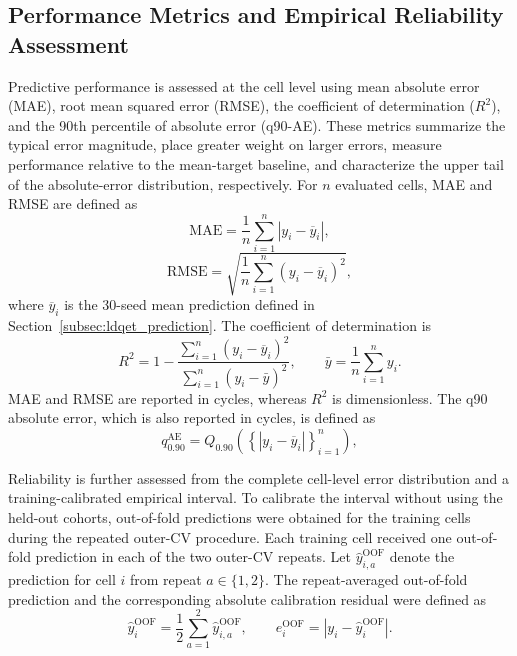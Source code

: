 \documentclass[pdflatex,sn-mathphys-num]{sn-jnl}
\begin{document}
\subsection{Performance Metrics and Empirical Reliability Assessment}
\label{subsec:reliability_protocol}

Predictive performance is assessed at the cell level using mean absolute error (MAE), root mean squared error (RMSE), the coefficient of determination ($R^2$), and the 90th percentile of absolute error
(q90-AE). These metrics summarize the typical error magnitude, place greater weight on larger errors, measure performance relative to the mean-target baseline, and characterize the upper tail of the absolute-error distribution, respectively. For $n$ evaluated cells, MAE and RMSE are defined as
\begin{equation}
\mathrm{MAE}=
\frac{1}{n}\sum_{i=1}^{n}\left|y_i-\overline{y}_i\right|,
\label{eq:mae}
\end{equation}
\begin{equation}
\mathrm{RMSE}=
\sqrt{\frac{1}{n}\sum_{i=1}^{n}\left(y_i-\overline{y}_i\right)^2},
\label{eq:rmse}
\end{equation}
where $\overline{y}_i$ is the 30-seed mean prediction defined in Section~\ref{subsec:ldqet_prediction}. The coefficient of determination is
\begin{equation}
R^2=
1-\frac{\sum_{i=1}^{n}\left(y_i-\overline{y}_i\right)^2}
{\sum_{i=1}^{n}\left(y_i-\bar{y}\right)^2},
\qquad
\bar{y}=\frac{1}{n}\sum_{i=1}^{n}y_i.
\label{eq:r2}
\end{equation}
MAE and RMSE are reported in cycles, whereas $R^2$ is dimensionless. The q90 absolute error, which is also reported in cycles, is defined as
\begin{equation}
q_{0.90}^{\mathrm{AE}}=
Q_{0.90}\!\left(
\left\{|y_i-\overline{y}_i|\right\}_{i=1}^{n}
\right),
\end{equation}

Reliability is further assessed from the complete cell-level error distribution and a training-calibrated empirical interval. To calibrate the interval without using the held-out cohorts, out-of-fold predictions were obtained for the training cells during the repeated outer-CV procedure. Each training cell received one out-of-fold prediction in each of the two outer-CV repeats. Let $\widehat{y}_{i,a}^{\mathrm{OOF}}$ denote the prediction for cell $i$ from repeat $a\in\{1,2\}$. The repeat-averaged out-of-fold prediction and the corresponding absolute calibration residual were defined as
\begin{equation}
\widehat{y}_i^{\mathrm{OOF}}
=
\frac{1}{2}
\sum_{a=1}^{2}
\widehat{y}_{i,a}^{\mathrm{OOF}},
\qquad
e_i^{\mathrm{OOF}}
=
\left|
y_i-\widehat{y}_i^{\mathrm{OOF}}
\right|.
\label{eq:oof_residual}
\end{equation}
\end{document}
